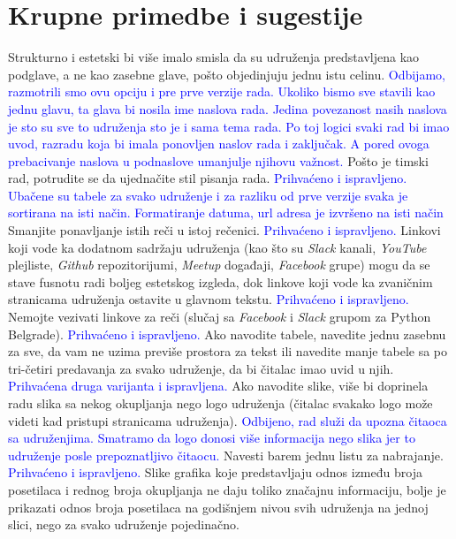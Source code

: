 \documentclass[a4paper]{report}
\newcommand{\odgovor}[1]{\textcolor{blue}{#1}}
\begin{document}
\section{Krupne primedbe i sugestije}
Strukturno i estetski bi više imalo smisla da su udruženja predstavljena kao podglave, 
a ne kao zasebne glave, pošto objedinjuju jednu istu celinu.
\odgovor{Odbijamo, razmotrili smo ovu opciju i pre prve verzije rada. Ukoliko bismo sve stavili kao jednu glavu, ta glava bi nosila ime naslova rada. Jedina povezanost nasih naslova je sto su sve to udruženja sto je i sama tema rada. Po toj logici svaki rad bi imao uvod, razradu koja bi imala ponovljen naslov rada i zaključak. A pored ovoga prebacivanje naslova u podnaslove umanjulje njihovu važnost.}
Pošto je timski rad, potrudite se da ujednačite stil pisanja rada.
\odgovor{Prihvaćeno i ispravljeno. Ubačene su tabele za svako udruženje i za razliku od prve verzije svaka je sortirana na isti način. Formatiranje datuma, url adresa je izvršeno na isti način} %
Smanjite ponavljanje istih reči u istoj rečenici.
\odgovor{Prihvaćeno i ispravljeno.}
Linkovi koji vode ka dodatnom sadržaju udruženja (kao što su \textit{Slack} kanali, \textit{YouTube} plejliste, \textit{Github} repozitorijumi, 
\textit{Meetup} događaji, \textit{Facebook} grupe) mogu da se stave fusnotu radi boljeg estetskog izgleda, dok
linkove koji vode ka zvaničnim stranicama udruženja ostavite u glavnom tekstu. 
\odgovor{Prihvaćeno i ispravljeno.}
Nemojte vezivati linkove za reči (slučaj sa \textit{Facebook} i \textit{Slack} grupom za Python Belgrade). 
\odgovor{Prihvaćeno i ispravljeno.}
Ako navodite tabele, navedite jednu zasebnu za sve, da vam ne uzima previše prostora za tekst ili
navedite manje tabele sa po tri-četiri predavanja za svako udruženje, da bi čitalac imao uvid u njih.
\odgovor{Prihvaćena druga varijanta i ispravljena.}
Ako navodite slike, više bi doprinela radu slika sa nekog okupljanja nego logo 
udruženja (čitalac svakako logo može videti kad pristupi stranicama udruženja).
\odgovor{Odbijeno, rad služi da upozna čitaoca sa udruženjima. Smatramo da logo donosi više informacija nego slika jer to udruženje posle prepoznatljivo čitaocu.}
Navesti barem jednu listu za nabrajanje.
\odgovor{Prihvaćeno i ispravljeno.}
Slike grafika koje predstavljaju odnos između broja posetilaca
i rednog broja okupljanja ne daju toliko značajnu informaciju, bolje je prikazati odnos broja posetilaca na
godišnjem nivou svih udruženja na jednoj slici, nego za svako udruženje pojedinačno.
\end{document}
